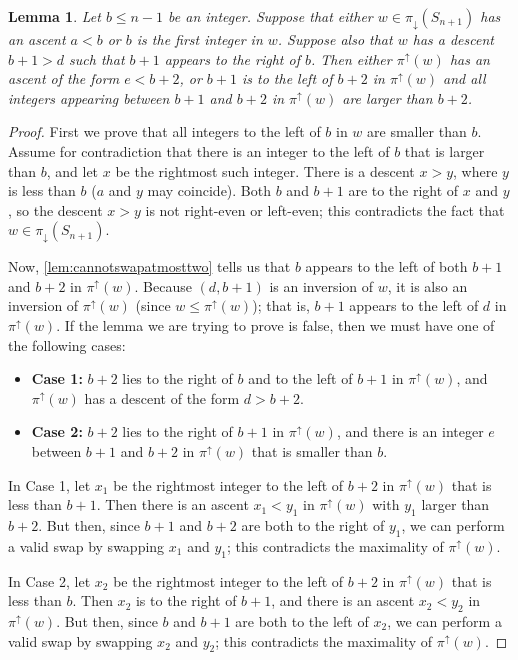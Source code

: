 \documentclass[11pt]{amsart}
\newtheorem{lemma}[theorem]{Lemma}
\theoremstyle{definition}
\begin{document}
\begin{lemma}\label{lem:b+2condition}
    Let $b\le n-1$ be an integer. Suppose that either $w\in \pi_\downarrow(S_{n+1})$ has an ascent $a<b$ or $b$ is the first integer in $w$. Suppose also that $w$ has a descent $b+1>d$ such that $b+1$ appears to the right of $b$. Then either $\pi^\uparrow(w)$ has an ascent of the form $e<b+2$, or $b+1$ is to the left of $b+2$ in $\pi^\uparrow(w)$ and all integers appearing between $b+1$ and $b+2$ in $\pi^\uparrow(w)$ are larger than $b+2$.
\end{lemma}

\begin{proof}
    First we prove that all integers to the left of $b$ in $w$ are smaller than $b$. Assume for contradiction that there is an integer to the left of $b$ that is larger than $b$, and let $x$ be the rightmost such integer. There is a descent $x>y$, where $y$ is less than $b$ ($a$ and $y$ may coincide). Both $b$ and $b+1$ are to the right of $x$ and $y$, so the descent $x>y$ is not right-even or left-even; this contradicts the fact that $w\in\pi_\downarrow(S_{n+1})$.
    
    Now, \cref{lem:cannotswapatmosttwo} tells us that $b$ appears to the left of both $b+1$ and $b+2$ in $\pi^\uparrow(w)$. Because $(d,b+1)$ is an inversion of $w$, it is also an inversion of $\pi^\uparrow(w)$ (since $w\leq\pi^\uparrow(w)$); that is, $b+1$ appears to the left of $d$ in $\pi^\uparrow(w)$. If the lemma we are trying to prove is false, then we must have one of the following cases:
    \begin{itemize}
        \item \textbf{Case 1: } $b+2$ lies to the right of $b$ and to the left of $b+1$ in $\pi^\uparrow(w)$, and $\pi^\uparrow(w)$ has a descent of the form $d>b+2$.
        \item \textbf{Case 2: } $b+2$ lies to the right of $b+1$ in $\pi^\uparrow(w)$, and there is an integer $e$ between $b+1$ and $b+2$ in $\pi^\uparrow(w)$ that is smaller than $b$.
    \end{itemize}
    
    In Case 1, let $x_1$ be the rightmost integer to the left of $b+2$ in $\pi^\uparrow(w)$ that is less than $b+1$. Then there is an ascent $x_1<y_1$ in $\pi^\uparrow(w)$ with $y_1$ larger than $b+2$. But then, since $b+1$ and $b+2$ are both to the right of $y_1$, we can perform a valid swap by swapping $x_1$ and $y_1$; this contradicts the maximality of $\pi^\uparrow(w)$.
    
    In Case 2, let $x_2$ be the rightmost integer to the left of $b+2$ in $\pi^\uparrow(w)$ that is less than $b$. Then $x_2$ is to the right of $b+1$, and there is an ascent $x_2<y_2$ in $\pi^\uparrow(w)$. But then, since $b$ and $b+1$ are both to the left of $x_2$, we can perform a valid swap by swapping $x_2$ and $y_2$; this contradicts the maximality of $\pi^\uparrow(w)$.
\end{proof}
\end{document}
